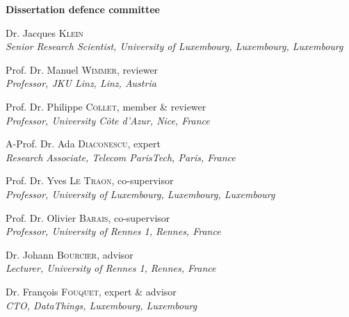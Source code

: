 \documentclass[12pt, twoside]{book}
\begin{document}
\begin{adjustwidth*}{1em}{1em}

\noindent
\textbf{\large Dissertation defence committee}

\vspace{0.2cm}
\noindent
Dr. Jacques \textsc{Klein}\\
{\small \emph{Senior Research Scientist, University of Luxembourg, Luxembourg, Luxembourg}}

\vspace{0.2cm}
\noindent
Prof. Dr. Manuel \textsc{Wimmer}, reviewer\\
{\small \emph{Professor, JKU Linz, Linz, Austria}}

\vspace{0.2cm}
\noindent
Prof. Dr. Philippe \textsc{Collet}, member \& reviewer\\
{\small \emph{Professor, University Côte d'Azur, Nice, France}}

\vspace{0.2cm}
\noindent
A-Prof. Dr. Ada \textsc{Diaconescu}, expert\\
{\small \emph{Research Associate, Telecom ParisTech, Paris, France}}   

\vspace{0.2cm}
\noindent
Prof. Dr. Yves \textsc{Le Traon}, co-supervisor\\
{\small \emph{Professor, University of Luxembourg, Luxembourg, Luxembourg}}

\vspace{0.2cm}
\noindent
Prof. Dr. Olivier \textsc{Barais}, co-supervisor\\
{\small \emph{Professor, University of Rennes 1, Rennes, France}}

\vspace{0.2cm}
\noindent
Dr. Johann \textsc{Bourcier}, advisor\\
{\small \emph{Lecturer, University of Rennes 1, Rennes, France}}   

\vspace{0.2cm}
\noindent
Dr.  Fran\c{c}ois \textsc{Fouquet}, expert \& advisor\\
{\small \emph{CTO, DataThings, Luxembourg, Luxembourg}}   

\end{adjustwidth*}
\end{document}
